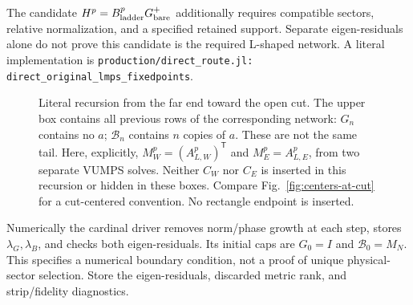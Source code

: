 \documentclass[11pt]{article}
\newcommand{\Gz}{G_{\mathrm{bare}}}
\newcommand{\code}[1]{{\small\nolinkurl{#1}}}
\begin{document}
The candidate $H^p=B_{\rm ladder}^p\Gz^+$ additionally requires compatible
sectors, relative normalization, and a specified retained support. Separate
eigen-residuals alone do not prove this candidate is the required L-shaped
network. A literal implementation is
\code{production/direct_route.jl: direct_original_lmps_fixedpoints}.

\ifdetailed
\begin{figure}[htbp]\centering
{}
\caption{Literal recursion from the far end toward the open cut. The upper
box contains all previous rows of the corresponding network: $G_n$ contains
no $a$; $\mathcal B_n$ contains $n$ copies of $a$. These are not the same
tail. Here, explicitly, $M_W^p=(A_{L,W}^p)^{\mathsf T}$ and
$M_E^p=A_{L,E}^p$, from two separate VUMPS solves. Neither $C_W$ nor $C_E$
is inserted in this recursion or hidden in these boxes. Compare
Fig.~\ref{fig:centers-at-cut} for a cut-centered convention.
No rectangle endpoint is inserted.}
\end{figure}
Numerically the cardinal driver removes norm/phase growth at each step,
stores $\lambda_G,\lambda_B$, and checks both eigen-residuals. Its initial
caps are $G_0=I$ and $\mathcal B_0=M_N$. This specifies a numerical boundary
condition, not a proof of unique physical-sector selection. Store the
eigen-residuals, discarded metric rank, and strip/fidelity diagnostics.
\fi
\end{document}
